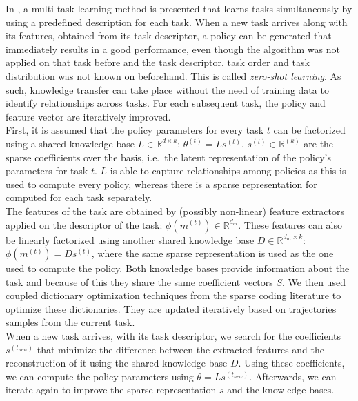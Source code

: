In \cite{Isele2016UsingLearning}, a multi-task learning method is presented that learns tasks simultaneously by using a predefined description for each task.
When a new task arrives along with its features, obtained from its task descriptor, a policy can be generated that immediately results in a good performance, even though the algorithm was not applied on that task before and the task descriptor, task order and task distribution was not known on beforehand. This is called \textit{zero-shot learning}.
As such, knowledge transfer can take place without the need of training data to identify relationships across tasks.
For each subsequent task, the policy and feature vector are iteratively improved.\\
First, it is assumed that the policy parameters for every task $t$ can be factorized using a shared knowledge base $L \in \mathbb{R}^{d \times k}$: $\theta^{(t)} = Ls^{(t)}$. $s^{(t)} \in \mathbb{R}^{(k)}$ are the sparse coefficients over the basis, i.e.\ the latent representation of the policy's parameters for task $t$. $L$ is able to capture relationships among policies as this is used to compute every policy, whereas there is a sparse representation for computed for each task separately.\\
The features of the task are obtained by (possibly non-linear) feature extractors applied on the descriptor of the task: $\phi(m^{(t)}) \in \mathbb{R}^{d_m}$.
These features can also be linearly factorized using another shared knowledge base $D \in \mathbb{R}^{d_m \times k}$: $\phi(m^{(t)}) = Ds^{(t)}$, where the same sparse representation is used as the one used to compute the policy.
Both knowledge bases provide information about the task and because of this they share the same coefficient vectors $S$.
We then used coupled dictionary optimization techniques from the sparse coding literature to optimize these dictionaries. They are updated iteratively based on trajectories samples from the current task.\\
When a new task arrives, with its task descriptor, we search for the coefficients $s^{(t_{new})}$ that minimize the difference between the extracted features and the reconstruction of it using the shared knowledge base $D$.
Using these coefficients, we can compute the policy parameters using $\theta = Ls^{(t_{new})}$. Afterwards, we can iterate again to improve the sparse representation $s$ and the knowledge bases.\\


